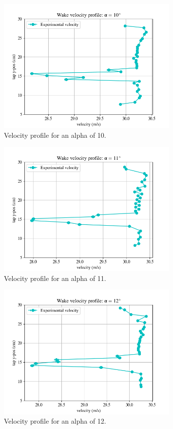 \documentclass[11pt, letterpaper]{article}
\begin{document}
\begin{appendices}
\begin{figure}[!hpt]
        \centering        
        \includegraphics[width=0.8\textwidth]{Figures/vel-graphs/vel-a10.png}
        \caption{Velocity profile for an alpha of 10\degree.}
        \label{fig:vel-a10}
\end{figure}

\begin{figure}[!hpt]
        \centering        
        \includegraphics[width=0.8\textwidth]{Figures/vel-graphs/vel-a11.png}
        \caption{Velocity profile for an alpha of 11\degree.}
        \label{fig:vel-a11}
\end{figure}

\begin{figure}[!hpt]
        \centering        
        \includegraphics[width=0.8\textwidth]{Figures/vel-graphs/vel-a12.png}
        \caption{Velocity profile for an alpha of 12\degree.}
        \label{fig:vel-a12}
\end{figure}


\end{appendices}
\end{document}
